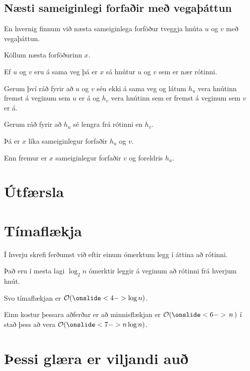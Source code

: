 \subsection{Næsti sameiginlegi forfaðir með vegaþáttun}
{
    {
        \item<1-> En hvernig finnum við næsta sameiginlega forföður tveggja hnúta $u$ og $v$ með vegaþáttun.
        \item<2-> Köllum næsta forföðurinn $x$.
        \item<3-> Ef $u$ og $v$ eru á sama veg þá er $x$ sá hnútur $u$ og $v$ sem er nær rótinni.
        \item<4-> Gerum því ráð fyrir að $u$ og $v$ séu ekki á sama veg og
                    látum $h_u$ vera hnútinn fremst á veginum sem $u$ er á og $h_v$ vera hnútinn sem er fremst á veginum sem $v$ er á.
        \item<5-> Gerum ráð fyrir að $h_u$ sé lengra frá rótinni en $h_v$.
        \item<6-> Þá er $x$ líka sameiginlegur forfaðir $h_u$ og $v$.
        \item<7-> Enn fremur er $x$ sameiginlegur forfaðir $v$ og foreldris $h_u$.
    }
}

\section{Útfærsla}
{
}

\section{Tímaflækja}
{
    {
        \item<1-> Í hverju skrefi ferðumst við eftir einum ómerktum legg í áttina að rótinni.
        \item<2-> Það eru í mesta lagi $\log_2 n$ ómerktir leggir á veginum að rótinni frá hverjum hnút.
        \item<3-> Svo tímaflækjan er $\mathcal{O}(\onslide<4->{\log n})$.
        \item<5-> Einn kostur þessara aðferðar er að minnisflækjan er
                    $\mathcal{O}(\onslide<6->{\,n\,})$ í stað þess að vera $\mathcal{O}(\onslide<7->{n \log n})$.
    }
}

\section{Þessi glæra er viljandi auð}
{
}


